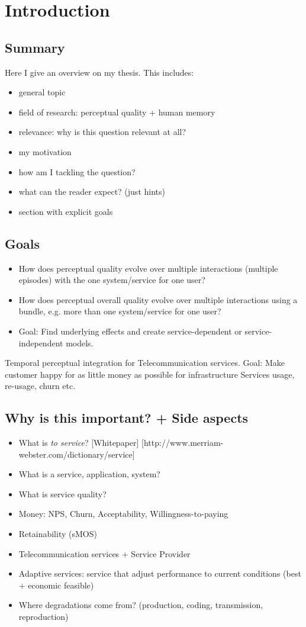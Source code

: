\chapter{Introduction}

\section*{Summary}
Here I give an overview on my thesis.
This includes:
\begin{itemize}
\item general topic
\item field of research: perceptual quality + human memory
\item relevance: why is this question relevant at all?
\item my motivation
\item how am I tackling the question?
\item what can the reader expect? (just hints)
\item section with explicit goals
\end{itemize}

\section{Goals}
\begin{itemize}
\item How does perceptual quality evolve over multiple interactions (multiple episodes) with the one system/service for one user?
\item How does perceptual overall quality evolve over multiple interactions using a bundle, e.g. more than one system/service for one user?
\item Goal: Find underlying effects and create service-dependent or service-independent models.
\end{itemize}

Temporal perceptual integration for Telecommunication services.
		Goal: Make customer happy for as little money as possible for infrastructure
		Services usage, re-usage, churn etc.

\section{Why is this important? + Side aspects}
\begin{itemize}
\item What is \emph{to service}? [Whitepaper] [http://www.merriam-webster.com/dictionary/service]
\item What is a service, application, system?
\item What is service quality?
\item Money: NPS, Churn, Acceptability, Willingness-to-paying
\item Retainability (sMOS)
\item Telecommunication services + Service Provider
\item Adaptive services: service that adjust performance to current conditions (best + economic feasible)
\item Where degradations come from? (production, coding, transmission, reproduction)
\end{itemize}
